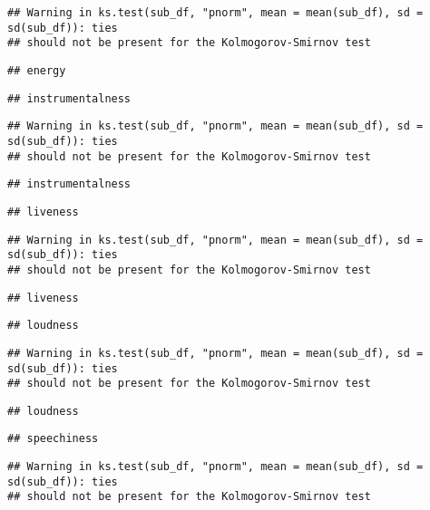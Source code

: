 \documentclass[
]{article}
\begin{document}
\begin{verbatim}
## Warning in ks.test(sub_df, "pnorm", mean = mean(sub_df), sd = sd(sub_df)): ties
## should not be present for the Kolmogorov-Smirnov test
\end{verbatim}

\begin{verbatim}
## energy
\end{verbatim}

\begin{verbatim}
## instrumentalness
\end{verbatim}

\begin{verbatim}
## Warning in ks.test(sub_df, "pnorm", mean = mean(sub_df), sd = sd(sub_df)): ties
## should not be present for the Kolmogorov-Smirnov test
\end{verbatim}

\begin{verbatim}
## instrumentalness
\end{verbatim}

\begin{verbatim}
## liveness
\end{verbatim}

\begin{verbatim}
## Warning in ks.test(sub_df, "pnorm", mean = mean(sub_df), sd = sd(sub_df)): ties
## should not be present for the Kolmogorov-Smirnov test
\end{verbatim}

\begin{verbatim}
## liveness
\end{verbatim}

\begin{verbatim}
## loudness
\end{verbatim}

\begin{verbatim}
## Warning in ks.test(sub_df, "pnorm", mean = mean(sub_df), sd = sd(sub_df)): ties
## should not be present for the Kolmogorov-Smirnov test
\end{verbatim}

\begin{verbatim}
## loudness
\end{verbatim}

\begin{verbatim}
## speechiness
\end{verbatim}

\begin{verbatim}
## Warning in ks.test(sub_df, "pnorm", mean = mean(sub_df), sd = sd(sub_df)): ties
## should not be present for the Kolmogorov-Smirnov test
\end{verbatim}
\end{document}
